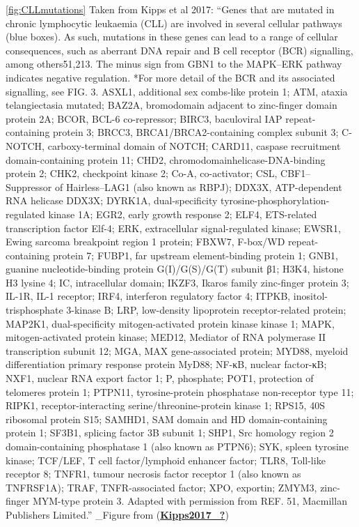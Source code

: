 \documentclass[11pt, a4paper, twosided]{book}
\begin{document}
\ref{fig:CLLmutations} Taken from Kipps et al 2017: ``Genes that are mutated in chronic lymphocytic leukaemia (CLL) are involved in several cellular pathways (blue boxes). As such, mutations in these genes can lead to a range of cellular consequences, such as aberrant DNA repair and B cell receptor (BCR) signalling, among others51,213. The minus sign from GBN1 to the MAPK--ERK pathway indicates negative regulation. *For more detail of the BCR and its associated signalling, see FIG. 3. ASXL1, additional sex combs-like protein 1; ATM, ataxia telangiectasia mutated; BAZ2A, bromodomain adjacent to zinc-finger domain protein 2A; BCOR, BCL-6 co-repressor; BIRC3, baculoviral IAP repeat-containing protein 3; BRCC3, BRCA1/BRCA2-containing complex subunit 3; C-NOTCH, carboxy-terminal domain of NOTCH; CARD11, caspase recruitment domain-containing protein 11; CHD2, chromodomainhelicase-DNA-binding protein 2; CHK2, checkpoint kinase 2; Co-A, co-activator; CSL, CBF1--Suppressor of Hairless--LAG1 (also known as RBPJ); DDX3X, ATP-dependent RNA helicase DDX3X; DYRK1A, dual-specificity tyrosine-phosphorylation-regulated kinase 1A; EGR2, early growth response 2; ELF4, ETS-related transcription factor Elf-4; ERK, extracellular signal-regulated kinase; EWSR1, Ewing sarcoma breakpoint region 1 protein; FBXW7, F-box/WD repeat-containing protein 7; FUBP1, far upstream element-binding protein 1; GNB1, guanine nucleotide-binding protein G(I)/G(S)/G(T) subunit β1; H3K4, histone H3 lysine 4; IC, intracellular domain; IKZF3, Ikaros family zinc-finger protein 3; IL-1R, IL-1 receptor; IRF4, interferon regulatory factor 4; ITPKB, inositol-trisphosphate 3-kinase B; LRP, low-density lipoprotein receptor-related protein; MAP2K1, dual-specificity mitogen-activated protein kinase kinase 1; MAPK, mitogen-activated protein kinase; MED12, Mediator of RNA polymerase II transcription subunit 12; MGA, MAX gene-associated protein; MYD88, myeloid differentiation primary response protein MyD88; NF-κB, nuclear factor-κB; NXF1, nuclear RNA export factor 1; P, phosphate; POT1, protection of telomeres protein 1; PTPN11, tyrosine-protein phosphatase non-receptor type 11; RIPK1, receptor-interacting serine/threonine-protein kinase 1; RPS15, 40S ribosomal protein S15; SAMHD1, SAM domain and HD domain-containing protein 1; SF3B1, splicing factor 3B subunit 1; SHP1, Src homology region 2 domain-containing phosphatase 1 (also known as PTPN6); SYK, spleen tyrosine kinase; TCF/LEF, T cell factor/lymphoid enhancer factor; TLR8, Toll-like receptor 8; TNFR1, tumour necrosis factor receptor 1 (also known as TNFRSF1A); TRAF, TNFR-associated factor; XPO, exportin; ZMYM3, zinc-finger MYM-type protein 3. Adapted with permission from REF. 51, Macmillan Publishers Limited.'' \_Figure from (\protect\hyperlink{ref-Kipps2017_}{\textbf{Kipps2017\_?}})
\end{document}
